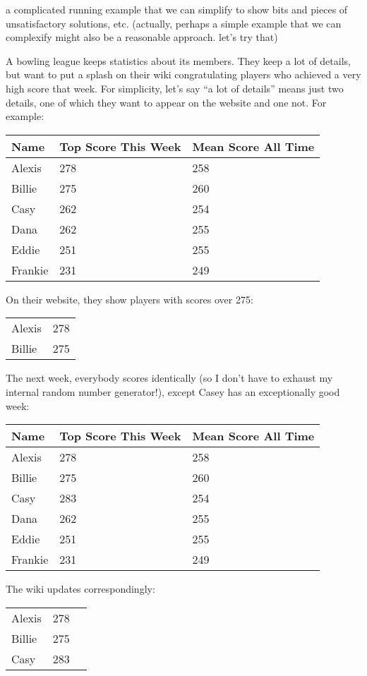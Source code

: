 \documentclass[12pt]{report}
\numberwithin{equation}{section}
\begin{document}
a complicated running example that we can simplify to show bits and pieces
of unsatisfactory solutions, etc. (actually, perhaps a simple example that
we can complexify might also be a reasonable approach. let's try that)

A bowling league keeps statistics about its members. They keep a lot of
details, but want to put a splash on their wiki congratulating players who
achieved a very high score that week.  For simplicity, let's say ``a lot of
details'' means just two details, one of which they want to appear on the
website and one not. For example:

\begin{tabular}{lll}
    Name & Top Score This Week & Mean Score All Time \\
    \hline
    Alexis  & 278 & 258 \\
    Billie  & 275 & 260 \\
    Casy    & 262 & 254 \\
    Dana    & 262 & 255 \\
    Eddie   & 251 & 255 \\
    Frankie & 231 & 249
\end{tabular}

On their website, they show players with scores over 275:

\begin{tabular}{ll}
    Alexis & 278 \\
    Billie & 275
\end{tabular}

The next week, everybody scores identically (so I don't have to exhaust my
internal random number generator!), except Casey has an exceptionally good
week:

\begin{tabular}{lll}
    Name & Top Score This Week & Mean Score All Time \\
    \hline
    Alexis  & 278 & 258 \\
    Billie  & 275 & 260 \\
    Casy    & 283 & 254 \\
    Dana    & 262 & 255 \\
    Eddie   & 251 & 255 \\
    Frankie & 231 & 249
\end{tabular}

The wiki updates correspondingly:

\begin{tabular}{lll}
    Alexis & 278 \\
    Billie & 275 \\
    Casy   & 283
\end{tabular}
\end{document}
